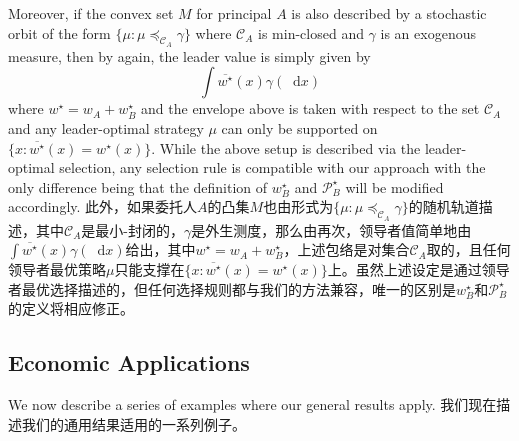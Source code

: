 \documentclass[12pt,letterpaper]{article}
\newenvironment{original}{\color{black}}{}
\newenvironment{translation}{\color{blue}}{}
\theoremstyle{plain}
\theoremstyle{definition}
\theoremstyle{remark}
\newcommand{\Pc}{\mathcal{P}}
\newcommand{\C}{\mathcal{C}}
\renewcommand*\d{\mathop{}\!\mathrm{d}}
\theoremstyle{definition}
\begin{document}
\begin{original}
Moreover, if the convex set $M$ for principal $A$ is also described by a stochastic orbit of the form $\{\mu: \mu \preceq_{\C_A} \gamma\}$ where $\C_A$ is min-closed and $\gamma$ is an exogenous measure, then by  again, the leader value is simply given by
\[\int \overline{w^\star}(x) \gamma(\d x)\]
where $w^\star = w_A + w^\star_B$ and the envelope above is taken with respect to the set $\C_A$ and any leader-optimal strategy $\mu$ can only be supported on $\{x: \overline{w^\star}(x) = w^\star(x)\}$. While the above setup is described via the leader-optimal selection, any selection rule is compatible with our approach with the only difference being that the definition of $w^\star_B$ and $\Pc^\star_B$  will be modified accordingly.
\end{original}
\begin{translation}
此外，如果委托人$A$的凸集$M$也由形式为$\{\mu: \mu \preceq_{\C_A} \gamma\}$的随机轨道描述，其中$\C_A$是最小-封闭的，$\gamma$是外生测度，那么由再次，领导者值简单地由$\int \overline{w^\star}(x) \gamma(\d x)$给出，其中$w^\star = w_A + w^\star_B$，上述包络是对集合$\C_A$取的，且任何领导者最优策略$\mu$只能支撑在$\{x: \overline{w^\star}(x) = w^\star(x)\}$上。虽然上述设定是通过领导者最优选择描述的，但任何选择规则都与我们的方法兼容，唯一的区别是$w^\star_B$和$\Pc^\star_B$的定义将相应修正。
\end{translation}

\subsection{Economic Applications}

\begin{original}
We now describe a series of examples where our general results apply.
\end{original}
\begin{translation}
我们现在描述我们的通用结果适用的一系列例子。
\end{translation}
\end{document}
